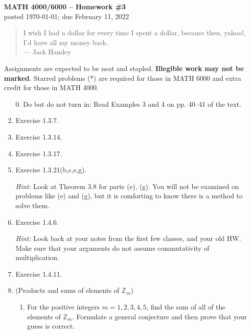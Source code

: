 \documentclass[11pt]{article}
\def\Z{\mathbb{Z}}
\theoremstyle{plain}
\theoremstyle{remark}
\begin{document}
\thispagestyle{empty} \begin{center} {\textbf{MATH 4000/6000 --
Homework \#3}\\ posted \today; due February 11, 2022}
\end{center}

\begin{quote} {\scriptsize I wish I had a dollar for every time I spent a dollar, because then, yahoo!, I'd have all my money back.\\
--- Jack Handey}
\end{quote}

\noindent Assignments are expected to be neat and stapled. \textbf{Illegible work may not be marked}. Starred problems (*) are required for those in MATH 6000 and extra credit for those in MATH 4000.


\begin{enumerate}

\item[0.] Do but do not turn in: Read Examples 3 and 4 on pp. 40--41 of the text.

\item Exercise 1.3.7.

\item Exercise 1.3.14.

\item Exercise 1.3.17.

\item Exercise 1.3.21(b,c,e,g).

{\scriptsize \emph{Hint:} Look at Theorem 3.8 for parts (e), (g). You will not be examined on problems like (e) and (g), but it is comforting to know there is a method to solve them.}

\item Exercise 1.4.6.

{\scriptsize \emph{Hint: } Look back at your notes from the first few classes, and your old HW. Make sure that your arguments do not assume commutativity of multiplication.}


\item Exercise 1.4.11.

\item (Products and sums of elements of $\Z_m$)
\begin{enumerate}
\item For the positive integers $m=1,2,3,4,5$, find the sum of all of the elements of $\Z_m$. Formulate a general conjecture and then prove that your guess is correct.


\end{enumerate}
\end{enumerate}
\end{document}
